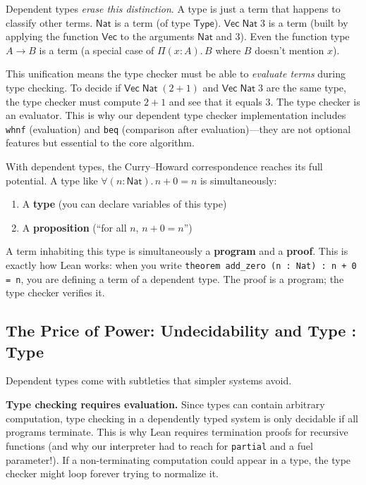 \documentclass[11pt,a4paper]{article}
\theoremstyle{definition}
\begin{document}
Dependent types \emph{erase this distinction}. A type is just a term that
happens to classify other terms. $\textsf{Nat}$ is a term (of type
$\textsf{Type}$). $\textsf{Vec}\;\textsf{Nat}\;3$ is a term (built by
applying the function $\textsf{Vec}$ to the arguments $\textsf{Nat}$ and $3$).
Even the function type $A \to B$ is a term (a special case of $\Pi(x{:}A).\,B$
where $B$ doesn't mention $x$).

This unification means the type checker must be able to \emph{evaluate terms}
during type checking. To decide if $\textsf{Vec}\;\textsf{Nat}\;(2+1)$ and
$\textsf{Vec}\;\textsf{Nat}\;3$ are the same type, the type checker must
compute $2+1$ and see that it equals $3$. The type checker is an evaluator.
This is why our dependent type checker implementation includes \texttt{whnf}
(evaluation) and \texttt{beq} (comparison after evaluation)---they are not
optional features but essential to the core algorithm.

\begin{intuition}
With dependent types, the Curry--Howard correspondence reaches its full
potential. A type like $\forall (n : \textsf{Nat}).\, n + 0 = n$ is
simultaneously:
\begin{enumerate}[leftmargin=2em]
\item A \textbf{type} (you can declare variables of this type)
\item A \textbf{proposition} (``for all $n$, $n + 0 = n$'')
\end{enumerate}
A term inhabiting this type is simultaneously a \textbf{program} and a
\textbf{proof}. This is exactly how Lean works: when you write
\texttt{theorem add\_zero (n : Nat) : n + 0 = n}, you are defining a term
of a dependent type. The proof is a program; the type checker verifies it.
\end{intuition}

\subsection{The Price of Power: Undecidability and Type : Type}

Dependent types come with subtleties that simpler systems avoid.

\textbf{Type checking requires evaluation.} Since types can contain arbitrary
computation, type checking in a dependently typed system is only decidable if
all programs terminate. This is why Lean requires termination proofs for
recursive functions (and why our interpreter had to reach for \texttt{partial}
and a fuel parameter!). If a non-terminating computation could appear
in a type, the type checker might loop forever trying to normalize it.
\end{document}
